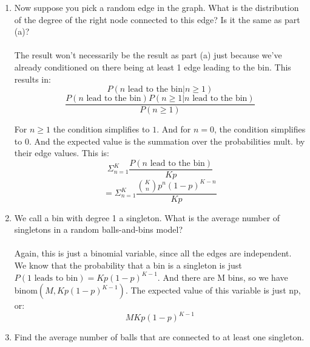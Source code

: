 \begin{enumerate}
\begin{enumerate}
      \item Now suppose you pick a random edge in the graph. What is the distribution of the degree of the right node connected to this edge? Is it the same as part (a)?\\\\

        The result won't necessarily be the result as part (a) just because we've already conditioned on there being at least 1 edge leading to the bin. This results in:
        $$P(n \text{ lead to the bin} | n \geq 1)$$
        $$\frac{P(n \text{ lead to the bin})P(n \geq 1 | n \text{ lead to the bin})}{P(n \geq 1)}$$

        For $n \geq 1$ the condition simplifies to $1$. And for $n = 0$, the condition simplifies to $0$. And the expected value is the summation over the probabilities mult. by their edge values. This is:
        $$\Sigma_{n=1}^K \frac{P(n \text{ lead to the bin})}{Kp}$$
        $$=\Sigma_{n=1}^K \frac{\binom{K}{n} p^n (1-p)^{K-n}}{Kp}$$
      \item We call a bin with degree 1 a singleton. What is the average number of singletons in a random balls-and-bins model?\\\\

        Again, this is just a binomial variable, since all the edges are independent. We know that the probability that a bin is a singleton is just $P(\text{1 leads to bin}) = Kp(1-p)^{K-1}$. And there are M bins, so we have binom$(M, Kp(1-p)^{K-1})$. The expected value of this variable is just np, or:
        $$MKp(1-p)^{K-1}$$
      \item Find the average number of balls that are connected to at least one singleton.
    \end{enumerate}
\end{enumerate}


